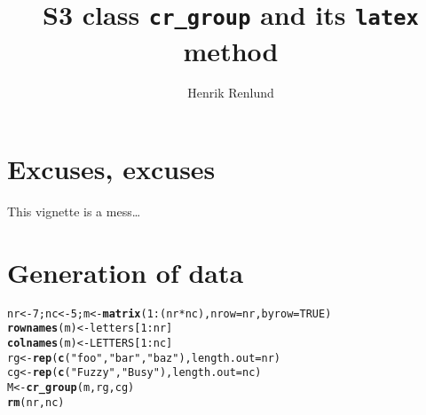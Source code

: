 \documentclass{article}\usepackage[]{graphicx}\usepackage[]{color}
\title{S3 class \texttt{cr\_group} and its \texttt{latex} method}
\author{Henrik Renlund}
\makeatletter
\newcommand{\hlnum}[1]{\textcolor[rgb]{0.686,0.059,0.569}{#1}}%
\newcommand{\hlstr}[1]{\textcolor[rgb]{0.192,0.494,0.8}{#1}}%
\newcommand{\hlopt}[1]{\textcolor[rgb]{0,0,0}{#1}}%
\newcommand{\hlstd}[1]{\textcolor[rgb]{0.345,0.345,0.345}{#1}}%
\newcommand{\hlkwb}[1]{\textcolor[rgb]{0.69,0.353,0.396}{#1}}%
\newcommand{\hlkwc}[1]{\textcolor[rgb]{0.333,0.667,0.333}{#1}}%
\newcommand{\hlkwd}[1]{\textcolor[rgb]{0.737,0.353,0.396}{\textbf{#1}}}%
\newenvironment{kframe}{%
 \def\at@end@of@kframe{}%
 \ifinner\ifhmode%
  \def\at@end@of@kframe{\end{minipage}}%
  \begin{minipage}{\columnwidth}%
 \fi\fi%
 \def\FrameCommand##1{\hskip\@totalleftmargin \hskip-\fboxsep
 \colorbox{shadecolor}{##1}\hskip-\fboxsep
     \hskip-\linewidth \hskip-\@totalleftmargin \hskip\columnwidth}%
 \MakeFramed {\advance\hsize-\width
   \@totalleftmargin\z@ \linewidth\hsize
   \@setminipage}}%
 {\par\unskip\endMakeFramed%
 \at@end@of@kframe}
\newenvironment{knitrout}{}{} %
\makeatother
\begin{document}
\maketitle
\tableofcontents



\setcounter{section}{-1}
\section{Excuses, excuses}
This vignette is a mess\ldots

\section{Generation of data}
\begin{knitrout}
\color{fgcolor}\begin{kframe}
\begin{alltt}
\hlstd{nr} \hlkwb{<-} \hlnum{7}\hlstd{; nc} \hlkwb{<-} \hlnum{5}\hlstd{; m} \hlkwb{<-} \hlkwd{matrix}\hlstd{(}\hlnum{1}\hlopt{:}\hlstd{(nr}\hlopt{*}\hlstd{nc),} \hlkwc{nrow}\hlstd{=nr,} \hlkwc{byrow}\hlstd{=}\hlnum{TRUE}\hlstd{)}
\hlkwd{rownames}\hlstd{(m)} \hlkwb{<-} \hlstd{letters[}\hlnum{1}\hlopt{:}\hlstd{nr]}
\hlkwd{colnames}\hlstd{(m)} \hlkwb{<-} \hlstd{LETTERS[}\hlnum{1}\hlopt{:}\hlstd{nc]}
\hlstd{rg} \hlkwb{<-} \hlkwd{rep}\hlstd{(}\hlkwd{c}\hlstd{(}\hlstr{"foo"}\hlstd{,} \hlstr{"bar"}\hlstd{,} \hlstr{"baz"}\hlstd{),} \hlkwc{length.out}\hlstd{=nr)}
\hlstd{cg} \hlkwb{<-} \hlkwd{rep}\hlstd{(}\hlkwd{c}\hlstd{(}\hlstr{"Fuzzy"}\hlstd{,} \hlstr{"Busy"}\hlstd{),} \hlkwc{length.out}\hlstd{=nc)}
\hlstd{M} \hlkwb{<-} \hlkwd{cr_group}\hlstd{(m, rg, cg)}
\hlkwd{rm}\hlstd{(nr, nc)}
\end{alltt}
\end{kframe}
\end{knitrout}
\end{document}
